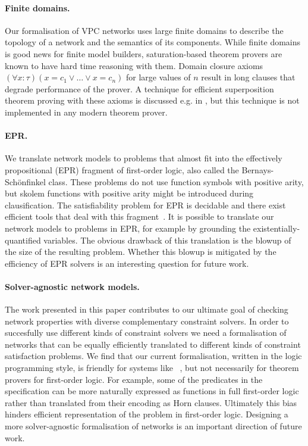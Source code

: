 \paragraph{Finite domains.}
Our formalisation of VPC networks uses large finite domains to describe the topology of a network and the semantics of its components. While finite domains is good news for finite model builders, saturation-based theorem provers are known to have hard time reasoning with them. Domain closure axioms $(\forall x:\tau)(x=c_1 \vee\ldots\vee x=c_n)$ for large values of $n$ result in long clauses that degrade performance of the prover. A technique for efficient superposition theorem proving with these axioms is discussed e.g. in \cite{HillenbrandWeidenbach13}, but this technique is not implemented in any modern theorem prover.

\paragraph{EPR.}
We translate network models to problems that almost fit into the effectively propositional (EPR) fragment of first-order logic, also called the Bernays-Sch\"onfinkel class. These problems do not use function symbols with positive arity, but skolem functions with positive arity might be introduced during clausification. The satisfiability problem for EPR is decidable and there exist efficient tools that deal with this fragment~\cite{DBLP:conf/birthday/Korovin13}. It is possible to translate our network models to problems in EPR, for example by grounding the existentially-quantified variables. The obvious drawback of this translation is the blowup of the size of the resulting problem. Whether this blowup is mitigated by the efficiency of EPR solvers is an interesting question for future work.

\paragraph{Solver-agnostic network models.}
The work presented in this paper contributes to our ultimate goal of checking network properties with diverse complementary constraint solvers. In order to succesfully use different kinds of constraint solvers we need a formalisation of networks that can be equally efficiently translated to different kinds of constraint satisfaction problems. We find that our current formalisation, written in the logic programming style, is friendly for systems like \Datalog~\cite{Datalog}, but not necessarily for theorem provers for first-order logic. For example, some of the predicates in the specification can be more naturally expressed as functions in full first-order logic rather than translated from their encoding as Horn clauses. Ultimately this bias hinders efficient representation of the problem in first-order logic. Designing a more solver-agnostic formalisation of networks is an important direction of future work.

